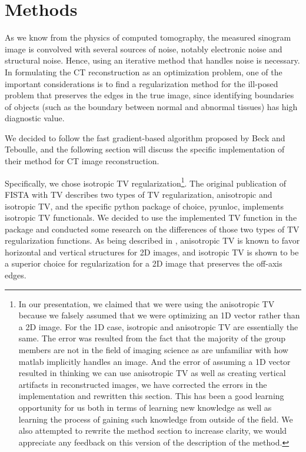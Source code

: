 \documentclass[12pt]{article}
\newcommand{\noin}{\noindent}
\begin{document}
\section{Methods}

\noin As we know from the physics of computed tomography, the measured sinogram image is convolved with several sources of noise, notably electronic noise and structural noise\cite{Duan2013-mi}. Hence, using an iterative method that handles noise is necessary. In formulating the CT reconstruction as an optimization problem, one of the important considerations is to find a regularization method for the ill-posed problem that preserves the edges in the true image, since identifying boundaries of objects (such as the boundary between normal and abnormal tissues) has high diagnostic value.

\vspace{0.2in}

\noin We decided to follow the fast gradient-based algorithm proposed by Beck and Teboulle\cite{Beck2009-id}, and the following section will discuss the specific implementation of their method for CT image reconstruction.

\vspace{0.2in}

\noin Specifically, we chose isotropic TV regularization\footnote{In our presentation, we claimed that we were using the anisotropic TV because we falsely assumed that we were optimizing an 1D vector rather than a 2D image. For the 1D case, isotropic and anisotropic TV are essentially the same. The error was resulted from the fact that the majority of the group members are not in the field of imaging science as are unfamiliar with how matlab implicitly handles an image. And the error of assuming a 1D vector resulted in thinking we can use anisotropic TV as well as creating vertical artifacts in reconstructed images, we have corrected the errors in the implementation and rewritten this section. This has been a good learning opportunity for us both in terms of learning new knowledge as well as learning the process of gaining such knowledge from outside of the field. We also attempted to rewrite the method section to increase clarity, we would appreciate any feedback on this version of the description of the method.}. The original publication of FISTA with TV\cite{Beck2009-id} describes two types of TV regularization, anisotropic and isotropic TV, and the specific python package of choice, pyunloc\cite{pyunlocbox}, implements isotropic TV functionals. We decided to use the implemented TV function in the package and conducted some research on the differences of those two types of TV regularization functions. As being described in \cite{Condat2017-uj}, anisotropic TV is known to favor horizontal and vertical structures for 2D images, and isotropic TV is shown to be a superior choice for regularization for a 2D image that preserves the off-axis edges. 
\end{document}
